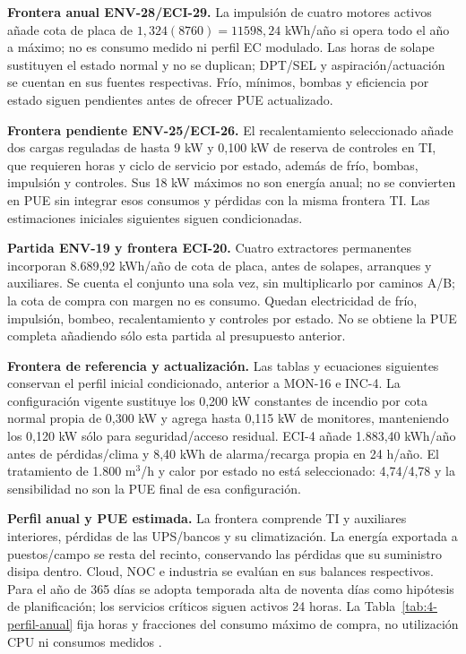 \textbf{Frontera anual ENV-28/ECI-29.} La impulsión de cuatro motores activos añade cota de placa de $1,324(8760)=11598,24$ kWh/año si opera todo el año a máximo; no es consumo medido ni perfil EC modulado. Las horas de solape sustituyen el estado normal y no se duplican; DPT/SEL y aspiración/actuación se cuentan en sus fuentes respectivas. Frío, mínimos, bombas y eficiencia por estado siguen pendientes antes de ofrecer PUE actualizado.

\textbf{Frontera pendiente ENV-25/ECI-26.} El recalentamiento seleccionado añade dos cargas reguladas de hasta 9 kW y 0,100 kW de reserva de controles en TI, que requieren horas y ciclo de servicio por estado, además de frío, bombas, impulsión y controles. Sus 18 kW máximos no son energía anual; no se convierten en PUE sin integrar esos consumos y pérdidas con la misma frontera TI. Las estimaciones iniciales siguientes siguen condicionadas.

\textbf{Partida ENV-19 y frontera ECI-20.} Cuatro extractores permanentes incorporan 8.689,92 kWh/año de cota de placa, antes de solapes, arranques y auxiliares. Se cuenta el conjunto una sola vez, sin multiplicarlo por caminos A/B; la cota de compra con margen no es consumo. Quedan electricidad de frío, impulsión, bombeo, recalentamiento y controles por estado. No se obtiene la PUE completa añadiendo sólo esta partida al presupuesto anterior. 

\textbf{Frontera de referencia y actualización.} Las tablas y ecuaciones siguientes conservan el perfil inicial condicionado, anterior a MON-16 e INC-4. La configuración vigente sustituye los 0,200 kW constantes de incendio por cota normal propia de 0,300 kW y agrega hasta 0,115 kW de monitores, manteniendo los 0,120 kW sólo para seguridad/acceso residual. ECI-4 añade 1.883,40 kWh/año antes de pérdidas/clima y 8,40 kWh de alarma/recarga propia en 24 h/año. El tratamiento de 1.800 m$^3$/h y calor por estado no está seleccionado: 4,74/4,78 y la sensibilidad no son la PUE final de esa configuración.

\textbf{Perfil anual y PUE estimada.} La frontera comprende TI y auxiliares interiores, pérdidas de las UPS/bancos y su climatización. La energía exportada a puestos/campo se resta del recinto, conservando las pérdidas que su suministro disipa dentro. Cloud, NOC e industria se evalúan en sus balances respectivos. Para el año de 365 días se adopta temporada alta de noventa días como hipótesis de planificación; los servicios críticos siguen activos 24 horas. La Tabla~\ref{tab:4-perfil-anual} fija horas y fracciones del consumo máximo de compra, no utilización CPU ni consumos medidos \parencites[RT-06.11, p.~15]{pucv-transversal}[cap.~15, RT-21.06]{caso07}.


